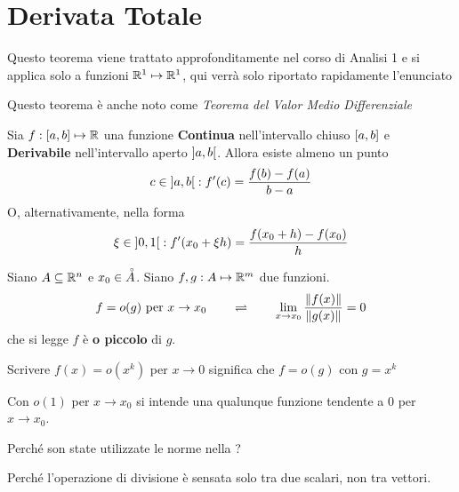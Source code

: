 \section{Derivata Totale}
\begin{theorem}[di Lagrange]\leavevmode\vspace*{-\baselineskip}
	\label{teo:lagrange}
	\begin{note}
		Questo teorema viene trattato approfonditamente nel corso di Analisi 1 e si applica solo a funzioni $\mathbb{R}^1 \mapsto \mathbb{R}^1$, qui verrà solo riportato rapidamente l'enunciato
	\end{note}
	\begin{note}
		Questo teorema è anche noto come \textit{Teorema del Valor Medio Differenziale}
	\end{note}
	Sia $f: \left[a,b\right] \mapsto \mathbb{R}$ una funzione \textbf{Continua} nell'intervallo chiuso $\left[a,b\right]$ e \textbf{Derivabile} nell'intervallo aperto $\left]a,b\right[$. Allora esiste almeno un punto
	\[c \in \left]a,b\right[ : f'(c) = \frac{f(b)-f(a)}{b - a}\]
	O, alternativamente, nella forma
	\[\xi \in \left]0,1\right[ : f'(x_0 + \xi h) = \frac{f(x_0 + h)-f(x_0)}{h}\]
\end{theorem}
\begin{definition}[o piccolo]
	\label{def:o_piccolo}
	Siano $A \subseteq \mathbb{R}^n$ e $x_0 \in \accentset{\circ}{A}$. Siano $f,g: A \mapsto \mathbb{R}^m$ due funzioni.
	\[f=o(g) \text{ per } x \to x_0 \qquad \rightleftharpoons \qquad \lim\limits_{x \to x_0} \frac{\left\|f(x)\right\|}{\left\|g(x)\right\|} = 0\]
	che si legge $f$ è \textbf{o piccolo} di $g$.
	\begin{note}
		Scrivere $f(x) = o(x^k)$ per $x \to 0$ significa che $f = o(g)$ con $g = x^k$
	\end{note}
	\begin{note}
		Con $o(1)$ per $x \to x_0$ si intende una qualunque funzione tendente a $0$ per $x \to x_0$.
	\end{note}
\end{definition}
\begin{exercise}
	Perché son state utilizzate le norme nella ?
	\begin{solution}
		Perché l'operazione di divisione è sensata solo tra due scalari, non tra vettori.
	\end{solution}
\end{exercise}
